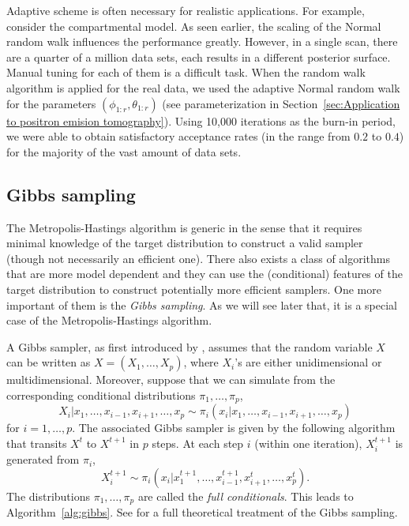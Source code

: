 Adaptive scheme is often necessary for realistic applications. For example,
consider the \pet compartmental model. As seen earlier, the scaling of the
Normal random walk influences the performance greatly. However, in a single
\pet scan, there are a quarter of a million data sets, each results in a
different posterior surface. Manual tuning for each of them is a difficult
task. When the random walk algorithm is applied for the real data, we used the
adaptive Normal random walk for the parameters $(\phi_{1:r},\theta_{1:r})$
(see parameterization in Section~\ref{sec:Application to positron emision
  tomography}). Using 10,000 iterations as the burn-in period, we were able to
obtain satisfactory acceptance rates (in the range from $0.2$ to $0.4$) for
the majority of the vast amount of data sets.

\subsection{Gibbs sampling}
\label{sub:Gibbs sampling}

The Metropolis-Hastings algorithm is generic in the sense that it requires
minimal knowledge of the target distribution to construct a valid sampler
(though not necessarily an efficient one). There also exists a class of \mcmc
algorithms that are more model dependent and they can use the (conditional)
features of the target distribution to construct potentially more efficient
samplers. One more important of them is the \emph{Gibbs sampling}. As we will
see later that, it is a special case of the Metropolis-Hastings algorithm.

A Gibbs sampler, as first introduced by \cite{Geman:1993bp}, assumes that the
random variable $X$ can be written as $X = (X_1,\dots,X_p)$, where $X_i$'s are
either unidimensional or multidimensional. Moreover, suppose that we can
simulate from the corresponding conditional distributions $\pi_1,\dots,\pi_p$,
\begin{equation}
  X_i|x_1,\dots,x_{i-1},x_{i+1},\dots,x_p
  \sim \pi_i(x_i|x_1,\dots,x_{i-1},x_{i+1},\dots,x_p)
\end{equation}
for $i = 1,\dots,p$. The associated Gibbs sampler is given by the following
algorithm that transits $X^t$ to $X^{t+1}$ in $p$ steps. At each step $i$
(within one iteration), $X_i^{t+1}$ is generated from $\pi_i$,
\begin{equation}
  X_i^{t+1} \sim
  \pi_i(x_i|x_1^{t+1},\dots,x_{i-1}^{t+1},x_{i+1}^t,\dots,x_p^t).
\end{equation}
The distributions $\pi_1,\dots,\pi_p$ are called the \emph{full conditionals}.
This leads to Algorithm~\ref{alg:gibbs}. See \cite[][chap.~8
and~9]{Robert:2004tn} for a full theoretical treatment of the Gibbs sampling.

